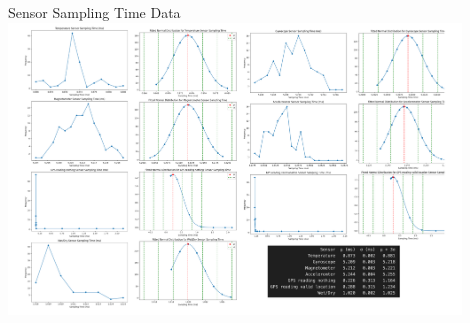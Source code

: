 


\begin{frame}{Sensor Sampling Time Data}
    \centering
    \includegraphics[height=0.9\textheight,width=0.9\textwidth,keepaspectratio]{images/samplingtimegraphs.png}
\end{frame}


